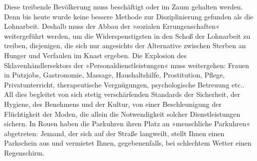 Diese treibende Bevölkerung muss beschäftigt oder im Zaum gehalten
werden. Denn bis heute wurde keine bessere Methode zur
Disziplinierung gefunden als die Lohnarbeit. Deshalb muss der Abbau
der »sozialen Errungenschaften« weitergeführt werden, um die
Widerspenstigsten in den Schoß der Lohnarbeit zu treiben,
diejenigen, die sich nur angesichts der Alternative zwischen
Sterben an Hunger und Verfaulen im Knast ergeben. Die Explosion des
Sklavenhändlersektors der »Personaldienstleistungen« muss
weitergehen: Frauen in Putzjobs, Gastronomie, Massage,
Haushaltshilfe, Prostitution, Pflege, Privatunterricht,
therapeutische Vergnügungen, psychologische Betreuung etc.. All
dies begleitet von sich stetig verschärfenden Standards der
Sicherheit, der Hygiene, des Benehmens und der Kultur, von einer
Beschleunigung der Flüchtigkeit der Moden, die allein die
Notwendigkeit solcher Dienstleistungen sichern. In Rouen haben die
Parkuhren ihren Platz an »menschliche Parkuhren« abgetreten:
Jemand, der sich auf der Straße langweilt, stellt Ihnen einen
Parkschein aus und vermietet Ihnen, gegebenenfalls, bei schlechtem
Wetter einen Regenschirm.

\extrapar{}

